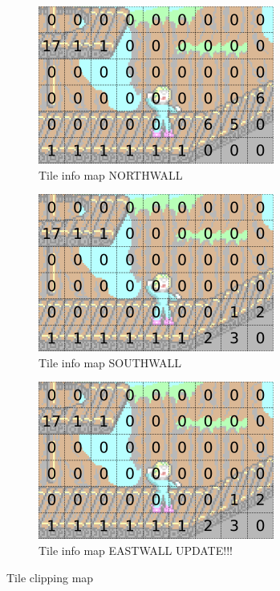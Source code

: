 \documentclass[book.tex]{subfiles}
\begin{document}
\begin{figure}
\centering
\begin{subfigure}{.33\textwidth}
  \centering
  \includegraphics[width=.9\textwidth]{screenshots_300dpi/game/clip_tinf_1.png}
  \caption{Tile info map NORTHWALL}
  \label{fig:clip_tinf_n}
\end{subfigure}%
\begin{subfigure}{.33\textwidth}
  \centering
  \includegraphics[width=.9\textwidth]{screenshots_300dpi/game/clip_tinf_south.png}
  \caption{Tile info map SOUTHWALL}
  \label{fig:clip_tinf_s}
\end{subfigure}
\begin{subfigure}{.33\textwidth}
  \centering
  \includegraphics[width=.9\textwidth]{screenshots_300dpi/game/clip_tinf_south.png}
  \caption{Tile info map EASTWALL UPDATE!!!}
  \label{fig:clip_tinf_e}
\end{subfigure}
\caption{Tile clipping map}
\label{fig:clip_tinf}
\end{figure}
\end{document}
